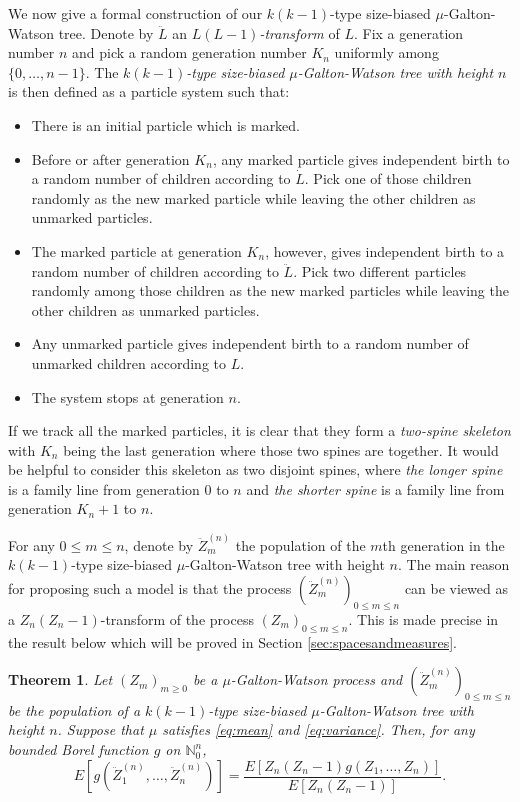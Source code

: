 \documentclass[12pt,a4paper]{amsart}
\newtheorem{thm}{Theorem}[section]
\numberwithin{equation}{section}
\begin{document}
	We now give a formal construction of our $k(k-1)$-type size-biased $\mu$-Galton-Watson tree.
	Denote by $\ddot L$ an \emph{$L(L-1)$-transform} of $L$.
	Fix a generation number $n$ and pick a random generation number $K_n$ uniformly among $\{0,\dots,n-1\}$.
	The \emph{$k(k-1)$-type size-biased $\mu$-Galton-Watson tree with height $n$} is then defined as a particle system such that:
\begin{itemize}
\item
	There is an initial particle which is marked.
\item
	Before or after generation $K_n$, any marked particle gives independent birth to a random number of children according to $\dot L$.
	Pick one of those children randomly as the new marked particle while leaving the other children as unmarked particles.
\item
	The marked particle at generation $K_n$, however, gives independent birth to a random number of children according to $\ddot L$.
	Pick two different particles randomly among those children as the new marked particles while leaving the other children as unmarked particles.
\item
	Any unmarked particle gives independent birth to a random number of unmarked children according to $L$.
\item
	The system stops at generation $n$.
\end{itemize}

	If we track all the marked particles, it is clear that they form a \emph{two-spine skeleton} with $K_n$ being the last generation where those two spines are together.
	It would be helpful to consider this skeleton as two disjoint spines,
	where \emph{the longer spine} is a family line from generation $0$ to $n$ and \emph{the shorter spine} is a family line from generation $K_n+1$ to $n$.
	
	For any $0\le m \le n$, denote by $\ddot Z_m^{(n)}$ the population of the $m$th generation in the $k(k-1)$-type size-biased $\mu$-Galton-Watson tree with height $n$.
	The main reason for proposing such a model is that the process $(\ddot Z_m^{(n)})_{0\le m\le n}$ can be viewed as 
    a $Z_n(Z_n-1)$-transform of the process $(Z_m)_{0\le m\le n}$.
	This is made precise in the result below which will be proved in Section \ref{sec:spacesandmeasures}.
\begin{thm}
\label{thm: change of measure}
	Let $(Z_m)_{m\ge 0}$ be a $\mu$-Galton-Watson process and $(\ddot Z_m^{(n)})_{0\le m\le n}$ be the population of a $k(k-1)$-type size-biased $\mu$-Galton-Watson tree with height $n$.
	Suppose that $\mu$ satisfies \eqref{eq:mean} and \eqref{eq:variance}.
	Then, for any bounded Borel function $g$ on $\mathbb N^{n}_0$,
\begin{equation*}
		E[ g ( \ddot Z_1^{(n)}, \dots, \ddot Z_n^{(n)})]
	=
		\frac{ E[ Z_n(Z_n-1) g( Z_1, \dots, Z_n)]} {E [ Z_n ( Z_n - 1)]}.		
\end{equation*}
\end{thm}
\end{document}
